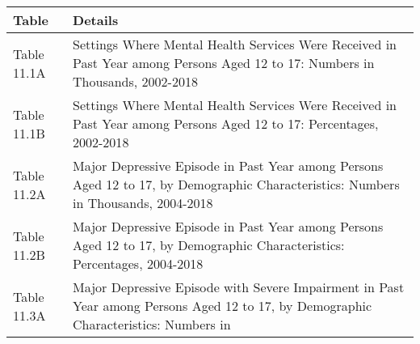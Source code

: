 \documentclass[
]{article}
\begin{document}
\begin{longtable}[]{@{}ll@{}}
\toprule
\begin{minipage}[b]{0.18\columnwidth}\raggedright
Table\strut
\end{minipage} & \begin{minipage}[b]{0.76\columnwidth}\raggedright
Details\strut
\end{minipage}\tabularnewline
\midrule
\endhead
\begin{minipage}[t]{0.18\columnwidth}\raggedright
Table 11.1A\strut
\end{minipage} & \begin{minipage}[t]{0.76\columnwidth}\raggedright
Settings Where Mental Health Services Were Received in Past Year among
Persons Aged 12 to 17: Numbers in Thousands, 2002-2018\strut
\end{minipage}\tabularnewline
\begin{minipage}[t]{0.18\columnwidth}\raggedright
Table 11.1B\strut
\end{minipage} & \begin{minipage}[t]{0.76\columnwidth}\raggedright
Settings Where Mental Health Services Were Received in Past Year among
Persons Aged 12 to 17: Percentages, 2002-2018\strut
\end{minipage}\tabularnewline
\begin{minipage}[t]{0.18\columnwidth}\raggedright
Table 11.2A\strut
\end{minipage} & \begin{minipage}[t]{0.76\columnwidth}\raggedright
Major Depressive Episode in Past Year among Persons Aged 12 to 17, by
Demographic Characteristics: Numbers in Thousands, 2004-2018\strut
\end{minipage}\tabularnewline
\begin{minipage}[t]{0.18\columnwidth}\raggedright
Table 11.2B\strut
\end{minipage} & \begin{minipage}[t]{0.76\columnwidth}\raggedright
Major Depressive Episode in Past Year among Persons Aged 12 to 17, by
Demographic Characteristics: Percentages, 2004-2018\strut
\end{minipage}\tabularnewline
\begin{minipage}[t]{0.18\columnwidth}\raggedright
Table 11.3A\strut
\end{minipage} & \begin{minipage}[t]{0.76\columnwidth}\raggedright
Major Depressive Episode with Severe Impairment in Past Year among
Persons Aged 12 to 17, by Demographic Characteristics: Numbers in

\end{minipage}
\end{longtable}
\end{document}

